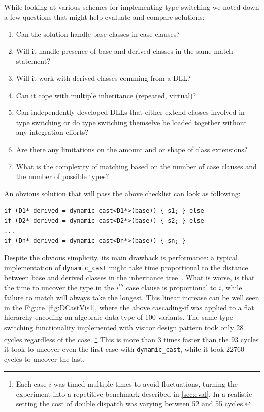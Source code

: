 \documentclass[preprint]{sigplanconf}
\makeatletter
\DeclareRobustCommand{\code}[1]{{\lstinline[breaklines=false,escapechar=@]{#1}}}
\makeatother
\begin{document}
While looking at various schemes for implementing type switching we noted down a 
few questions that might help evaluate and compare solutions: 

\begin{enumerate}
\item Can the solution handle base classes in case clauses?
\item Will it handle presence of base and derived classes in the same match statement?
\item Will it work with derived classes comming from a DLL?
\item Can it cope with multiple inheritance (repeated, virtual)?
\item Can independently developed DLLs that either extend classes involved in 
      type switching or do type switching themselve be loaded together without 
      any integration efforts?
\item Are there any limitations on the amount and or shape of class extensions?
\item What is the complexity of matching based on the number of case clauses and 
      the number of possible types?
\end{enumerate}

An obvious solution that will pass the above checklist can look as following:

\begin{lstlisting}
if (D1* derived = dynamic_cast<D1*>(base)) { s1; } else
if (D2* derived = dynamic_cast<D2*>(base)) { s2; } else
...
if (Dn* derived = dynamic_cast<Dn*>(base)) { sn; }
\end{lstlisting}

Despite the obvious simplicity, its main drawback is performance: a typical 
implementation of \code{dynamic_cast} might take time proportional to the 
distance between base and derived classes in the inheritance tree~\cite{}.
What is worse, is that the time to uncover the type in the $i^{th}$ case clause 
is proportional to $i$, while failure to match will always take the longest. 
This linear increase can be well seen in the Figure~\ref{fig:DCastVis1}, where 
the above cascading-if was applied to a flat hierarchy encoding an algebraic 
data type of 100 variants. The same type-switching functionality implemented 
with visitor design pattern took only 28 cycles regardless of the case.
\footnote{Each case $i$ was timed multiple times to avoid fluctuations, turning 
the experiment into a repetitive benchmark described in 
\textsection\ref{sec:eval}. In a realistic setting the cost of double dispatch 
was varying between 52 and 55 cycles.}
This is more than 3 times faster than the 93 cycles it took to uncover even the 
first case with \code{dynamic_cast}, while it took 22760 cycles to uncover the 
last.
\end{document}

